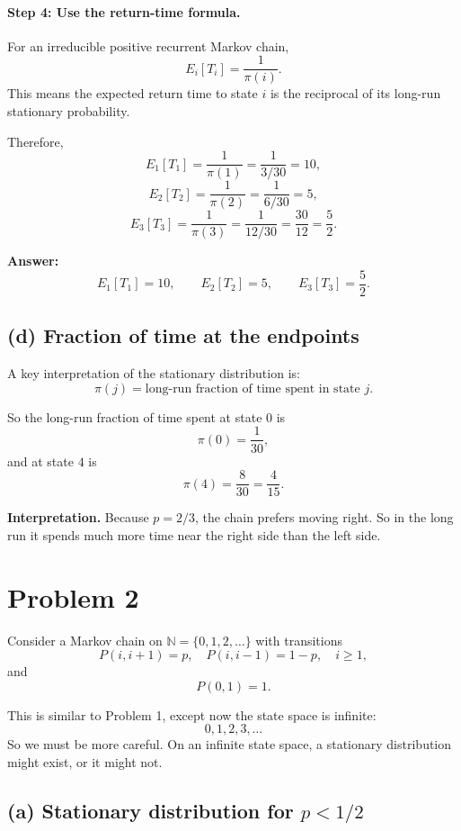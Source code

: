 \documentclass[11pt]{article}
\begin{document}
\paragraph{Step 4: Use the return-time formula.}

For an irreducible positive recurrent Markov chain,
\[
E_i[T_i]=\frac{1}{\pi(i)}.
\]
This means the expected return time to state $i$ is the reciprocal of its long-run stationary probability.

Therefore,
\[
E_1[T_1]=\frac{1}{\pi(1)}=\frac{1}{3/30}=10,
\]
\[
E_2[T_2]=\frac{1}{\pi(2)}=\frac{1}{6/30}=5,
\]
\[
E_3[T_3]=\frac{1}{\pi(3)}=\frac{1}{12/30}=\frac{30}{12}=\frac52.
\]

\bigskip
\noindent
\textbf{Answer:}
\[
E_1[T_1]=10,\qquad E_2[T_2]=5,\qquad E_3[T_3]=\frac52.
\]

\subsection*{(d) Fraction of time at the endpoints}

A key interpretation of the stationary distribution is:
\[
\pi(j)=\text{long-run fraction of time spent in state }j.
\]

So the long-run fraction of time spent at state $0$ is
\[
\pi(0)=\frac{1}{30},
\]
and at state $4$ is
\[
\pi(4)=\frac{8}{30}=\frac{4}{15}.
\]

\bigskip
\noindent
\textbf{Interpretation.}  
Because $p=2/3$, the chain prefers moving right.
So in the long run it spends much more time near the right side than the left side.

\newpage

\section*{Problem 2}

Consider a Markov chain on $\mathbb N=\{0,1,2,\dots\}$ with transitions
\[
P(i,i+1)=p,\quad P(i,i-1)=1-p, \quad i\ge1,
\]
and
\[
P(0,1)=1.
\]

\bigskip

This is similar to Problem 1, except now the state space is infinite:
\[
0,1,2,3,\dots
\]
So we must be more careful. On an infinite state space, a stationary distribution might exist, or it might not.

\subsection*{(a) Stationary distribution for $p<1/2$}
\end{document}
